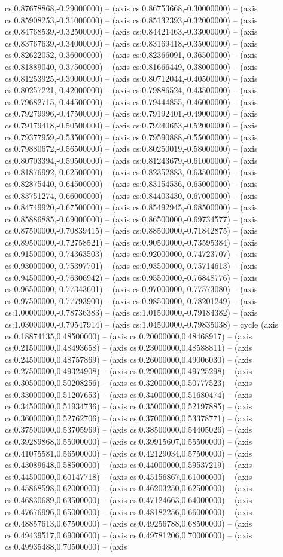 cs:0.87678868,-0.29000000) -- (axis cs:0.86753668,-0.30000000) -- (axis cs:0.85908253,-0.31000000) -- (axis cs:0.85132393,-0.32000000) -- (axis cs:0.84768539,-0.32500000) -- (axis cs:0.84421463,-0.33000000) -- (axis cs:0.83767639,-0.34000000) -- (axis cs:0.83169418,-0.35000000) -- (axis cs:0.82622052,-0.36000000) -- (axis cs:0.82366091,-0.36500000) -- (axis cs:0.81889040,-0.37500000) -- (axis cs:0.81666449,-0.38000000) -- (axis cs:0.81253925,-0.39000000) -- (axis cs:0.80712044,-0.40500000) -- (axis cs:0.80257221,-0.42000000) -- (axis cs:0.79886524,-0.43500000) -- (axis cs:0.79682715,-0.44500000) -- (axis cs:0.79444855,-0.46000000) -- (axis cs:0.79279996,-0.47500000) -- (axis cs:0.79192401,-0.49000000) -- (axis cs:0.79179418,-0.50500000) -- (axis cs:0.79240653,-0.52000000) -- (axis cs:0.79377959,-0.53500000) -- (axis cs:0.79590888,-0.55000000) -- (axis cs:0.79880672,-0.56500000) -- (axis cs:0.80250019,-0.58000000) -- (axis cs:0.80703394,-0.59500000) -- (axis cs:0.81243679,-0.61000000) -- (axis cs:0.81876992,-0.62500000) -- (axis cs:0.82352883,-0.63500000) -- (axis cs:0.82875440,-0.64500000) -- (axis cs:0.83154536,-0.65000000) -- (axis cs:0.83751274,-0.66000000) -- (axis cs:0.84403430,-0.67000000) -- (axis cs:0.84749920,-0.67500000) -- (axis cs:0.85492945,-0.68500000) -- (axis cs:0.85886885,-0.69000000) -- (axis cs:0.86500000,-0.69734577) -- (axis cs:0.87500000,-0.70839415) -- (axis cs:0.88500000,-0.71842875) -- (axis cs:0.89500000,-0.72758521) -- (axis cs:0.90500000,-0.73595384) -- (axis cs:0.91500000,-0.74363503) -- (axis cs:0.92000000,-0.74723707) -- (axis cs:0.93000000,-0.75397701) -- (axis cs:0.93500000,-0.75714613) -- (axis cs:0.94500000,-0.76306942) -- (axis cs:0.95500000,-0.76848776) -- (axis cs:0.96500000,-0.77343601) -- (axis cs:0.97000000,-0.77573080) -- (axis cs:0.97500000,-0.77793900) -- (axis cs:0.98500000,-0.78201249) -- (axis cs:1.00000000,-0.78736383) -- (axis cs:1.01500000,-0.79184382) -- (axis cs:1.03000000,-0.79547914) -- (axis cs:1.04500000,-0.79835038) -- cycle (axis cs:0.18874135,0.48500000) -- (axis cs:0.20000000,0.48468917) -- (axis cs:0.21500000,0.48493658) -- (axis cs:0.23000000,0.48588811) -- (axis cs:0.24500000,0.48757869) -- (axis cs:0.26000000,0.49006030) -- (axis cs:0.27500000,0.49324908) -- (axis cs:0.29000000,0.49725298) -- (axis cs:0.30500000,0.50208256) -- (axis cs:0.32000000,0.50777523) -- (axis cs:0.33000000,0.51207653) -- (axis cs:0.34000000,0.51680474) -- (axis cs:0.34500000,0.51934736) -- (axis cs:0.35000000,0.52197885) -- (axis cs:0.36000000,0.52762706) -- (axis cs:0.37000000,0.53378771) -- (axis cs:0.37500000,0.53705969) -- (axis cs:0.38500000,0.54405026) -- (axis cs:0.39289868,0.55000000) -- (axis cs:0.39915607,0.55500000) -- (axis cs:0.41075581,0.56500000) -- (axis cs:0.42129034,0.57500000) -- (axis cs:0.43089648,0.58500000) -- (axis cs:0.44000000,0.59537219) -- (axis cs:0.44500000,0.60147718) -- (axis cs:0.45156867,0.61000000) -- (axis cs:0.45868598,0.62000000) -- (axis cs:0.46203250,0.62500000) -- (axis cs:0.46830689,0.63500000) -- (axis cs:0.47124663,0.64000000) -- (axis cs:0.47676996,0.65000000) -- (axis cs:0.48182256,0.66000000) -- (axis cs:0.48857613,0.67500000) -- (axis cs:0.49256788,0.68500000) -- (axis cs:0.49439517,0.69000000) -- (axis cs:0.49781206,0.70000000) -- (axis cs:0.49935488,0.70500000) -- (axis 
